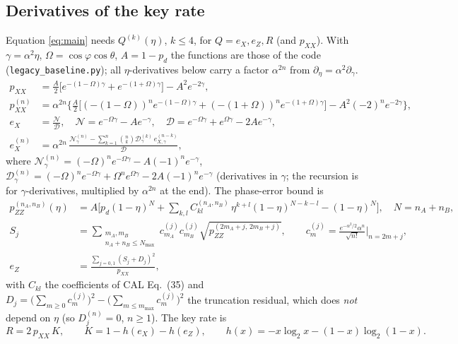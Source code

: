 \subsection{Derivatives of the key rate}
\label{sec:deriv}

Equation \eqref{eq:main} needs $Q^{(k)}(\eta)$, $k\le4$, for $Q=e_X,e_Z,R$ (and $p_{XX}$). With $\gamma=\alpha^2\eta$, $\Omega=\cos\varphi\cos\theta$, $A=1-p_d$ the functions are those of the code (\texttt{legacy\_baseline.py}); all $\eta$-derivatives below carry a factor $\alpha^{2n}$ from $\partial_\eta=\alpha^2\partial_\gamma$.
\begin{align}
  p_{XX}&=\tfrac A2\big[e^{-(1-\Omega)\gamma}+e^{-(1+\Omega)\gamma}\big]-A^2e^{-2\gamma},\\
  p_{XX}^{(n)}&=\alpha^{2n}\Big\{\tfrac A2\big[(-(1-\Omega))^{n}e^{-(1-\Omega)\gamma}+(-(1+\Omega))^{n}e^{-(1+\Omega)\gamma}\big]-A^2(-2)^{n}e^{-2\gamma}\Big\},\\
  e_X&=\frac{\mathcal N}{\mathcal D},\quad \mathcal N=e^{-\Omega\gamma}-Ae^{-\gamma},\quad \mathcal D=e^{-\Omega\gamma}+e^{\Omega\gamma}-2Ae^{-\gamma},\\
  e_X^{(n)}&=\alpha^{2n}\,\frac{\mathcal N_\gamma^{(n)}-\sum_{k=1}^{n}\binom nk\mathcal D_\gamma^{(k)}\,e_{X,\gamma}^{(n-k)}}{\mathcal D},
\end{align}
where $\mathcal N_\gamma^{(n)}=(-\Omega)^ne^{-\Omega\gamma}-A(-1)^ne^{-\gamma}$, $\mathcal D_\gamma^{(n)}=(-\Omega)^ne^{-\Omega\gamma}+\Omega^ne^{\Omega\gamma}-2A(-1)^ne^{-\gamma}$ (derivatives in $\gamma$; the recursion is for $\gamma$-derivatives, multiplied by $\alpha^{2n}$ at the end). The phase-error bound is
\begin{align}
  p_{ZZ}^{(n_A,n_B)}(\eta)&=A\Big[p_d(1-\eta)^{N}+\sum_{k,l}C^{(n_A,n_B)}_{kl}\,\eta^{k+l}(1-\eta)^{N-k-l}-(1-\eta)^{N}\Big],\quad N=n_A+n_B,\\
  S_j&=\sum_{\substack{m_A,m_B\\ n_A+n_B\le N_{\max}}}c^{(j)}_{m_A}c^{(j)}_{m_B}\sqrt{p_{ZZ}^{(2m_A+j,\,2m_B+j)}},\qquad
  c^{(j)}_{m}=\frac{e^{-\alpha^2/2}\alpha^{n}}{\sqrt{n!}}\Big|_{n=2m+j},\\
  e_Z&=\frac{\sum_{j=0,1}(S_j+D_j)^2}{p_{XX}},
\end{align}
with $C_{kl}$ the coefficients of CAL Eq.~(35) and $D_j=\big(\sum_{m\ge0}c^{(j)}_m\big)^2-\big(\sum_{m\le m_{\max}}c^{(j)}_m\big)^2$ the truncation residual, which does \emph{not} depend on $\eta$ (so $D_j^{(n)}=0$, $n\ge1$). The key rate is
\begin{equation}
  R=2\,p_{XX}\,K,\qquad K=1-h(e_X)-h(e_Z),\qquad h(x)=-x\log_2x-(1-x)\log_2(1-x).
\end{equation}
